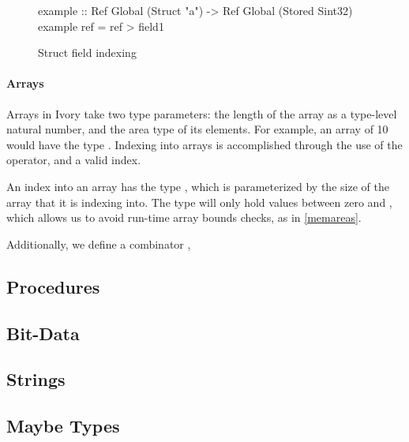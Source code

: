 \begin{figure}[h]
\begin{code}
example :: Ref Global (Struct "a")
        -> Ref Global (Stored Sint32)
example ref = ref \mytilde> field1
\end{code}
\caption{Struct field indexing}
\label{example-struct-label}
\end{figure}

\paragraph{Arrays}
Arrays in Ivory take two type parameters: the length of the array as a
type-level natural number, and the area type of its elements.  For example, an
array of 10  would have the type .  Indexing into arrays is accomplished through the use of the \cd{(!)}
operator, and a valid index.

An index into an array has the type , which is parameterized by the size
of the array that it is indexing into.  The  type will only hold
values between zero and , which allows us to avoid run-time array bounds
checks, as in \ref{memareas}.

Additionally, we define a combinator , 


\subsection{Procedures}

\subsection{Bit-Data}

\subsection{Strings}

\subsection{Maybe Types}


